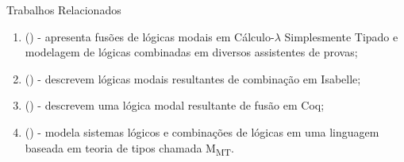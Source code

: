 \begin{frame}{Trabalhos Relacionados}
    \begin{enumerate}
        \item {} (\citeyear{benzmuller2010combining}) -
            apresenta fusões de lógicas modais em Cálculo-\(\lambda\) Simplesmente Tipado e modelagem de lógicas combinadas em diversos assistentes de provas;
        \item {} (\citeyear{fuenmayor2019mechanised}) -
            descrevem lógicas modais resultantes de combinação em Isabelle;
        \item {} (\citeyear{lescanne2007dynamic}) -
            descrevem uma lógica modal resultante de fusão em Coq;
        \item {} (\citeyear{rabe2017identify}) -
            modela sistemas lógicos e combinações de lógicas em uma linguagem baseada em teoria de tipos chamada M\textsubscript{MT}.
    \end{enumerate}
\end{frame}